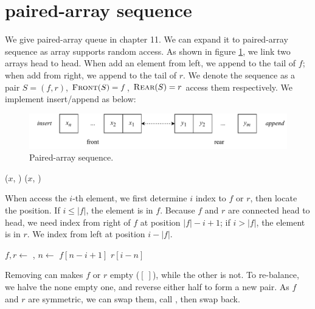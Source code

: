 \documentclass[b5paper]{article}
\begin{document}
\section{paired-array sequence}

We give paired-array queue in chapter 11. We can expand it to paired-array sequence as array supports random access. As shown in figure \ref{fig:parrays}, we link two arrays head to head. When add an element from left, we append to the tail of $f$; when add from right, we append to the tail of $r$. We denote the sequence as a pair $S = (f, r)$, $\textproc{Front}(S) = f$, $\textproc{Rear}(S) = r$ access them respectively. We implement insert/append as below:

\begin{figure}[htbp]
  \centering
  \includegraphics[scale=0.7]{img/parrays}
  \caption{Paired-array sequence.}
  \label{fig:parrays}
\end{figure}

\begin{algorithmic}[1]
  \State {}($x$, )
\EndFunction
{}
  \State {}($x$, )
\EndFunction
\end{algorithmic}


When access the $i$-th element, we first determine $i$ index to $f$ or $r$, then locate the position. If $ i \leq |f|$, the element is in $f$. Because $f$ and $r$ are connected head to head, we need index from right of $f$ at position $|f| - i + 1$; if $i > |f|$, the element is in $r$. We index from left at position $i - |f|$.

\begin{algorithmic}[1]
  \State $f, r \gets $ , 
  \State $n \gets $ 
    \State \Return $f[n - i + 1]$ 
  \Else
    \State \Return $r[i - n]$
  \EndIf
\EndFunction
\end{algorithmic}

Removing can makes $f$ or $r$ empty ($[\ ]$), while the other is not. To re-balance, we halve the none empty one, and reverse either half to form a new pair. As $f$ and $r$ are symmetric, we can swap them, call , then swap back.
\end{document}
